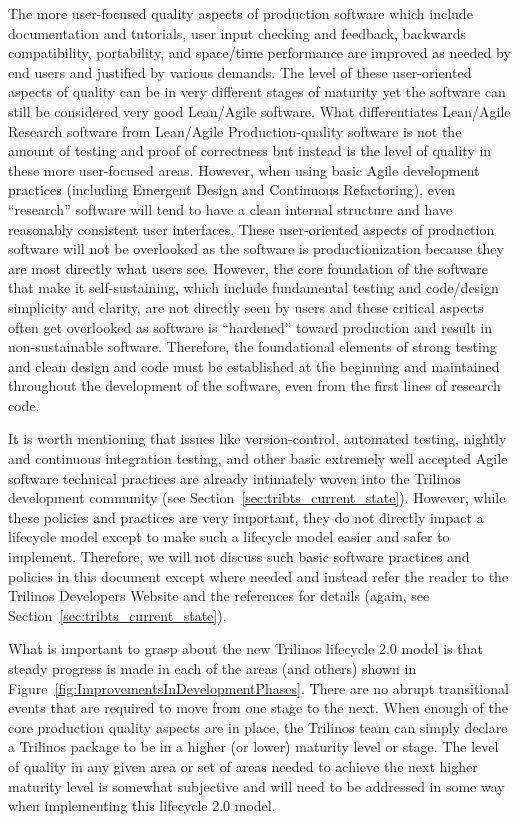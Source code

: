 \documentclass[11pt]{SANDreport}
\begin{document}
The more user-focused quality aspects of production software which
include documentation and tutorials, user input checking and feedback,
backwards compatibility, portability, and space/time performance are
improved as needed by end users and justified by various demands.  The
level of these user-oriented aspects of quality can be in very
different stages of maturity yet the software can still be considered
very good Lean/Agile software.  What differentiates Lean/Agile
Research software from Lean/Agile Production-quality software is not
the amount of testing and proof of correctness but instead is the
level of quality in these more user-focused areas.  However, when
using basic Agile development practices (including Emergent Design and
Continuous Refactoring), even ``research'' software will tend to have
a clean internal structure and have reasonably consistent user
interfaces.  These user-oriented aspects of production software will
not be overlooked as the software is productionization because they
are most directly what users see.  However, the core foundation of the
software that make it self-sustaining, which include fundamental
testing and code/design simplicity and clarity, are not directly seen
by users and these critical aspects often get overlooked as software
is ``hardened'' toward production and result in non-sustainable
software.  Therefore, the foundational elements of strong testing and
clean design and code must be established at the beginning and
maintained throughout the development of the software, even from the
first lines of research code.

It is worth mentioning that issues like version-control, automated
testing, nightly and continuous integration testing, and other basic
extremely well accepted Agile software technical practices are
already intimately woven into the Trilinos development community (see
Section~\ref{sec:tribts_current_state}).  However, while these
policies and practices are very important, they do not directly
impact a lifecycle model except to make such a lifecycle model easier
and safer to implement.  Therefore, we will not discuss such basic
software practices and policies in this document except where needed
and instead refer the reader to the Trilinos Developers Website and
the references for details (again, see
Section~\ref{sec:tribts_current_state}).

What is important to grasp about the new Trilinos lifecycle 2.0 model
is that steady progress is made in each of the areas (and others)
shown in Figure~\ref{fig:ImprovementsInDevelopmentPhases}.  There are
no abrupt transitional events that are required to move from one stage
to the next.  When enough of the core production quality aspects are
in place, the Trilinos team can simply declare a Trilinos package to
be in a higher (or lower) maturity level or stage.  The level of
quality in any given area or set of areas needed to achieve the next
higher maturity level is somewhat subjective and will need to be
addressed in some way when implementing this lifecycle 2.0 model.
\end{document}
